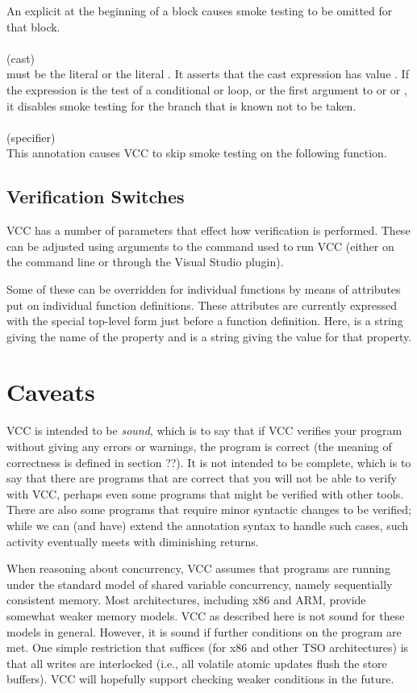 \documentclass[preprint,nocopyrightspace]{sigplanconf}
\begin{document}
{{{An explicit  at the beginning of a block causes
smoke testing to be omitted for that block. 
\\\\
 (cast)\\
 must be the literal \vcc{\true} or the
literal \vcc{\false}. It asserts that the cast expression has
value . If the expression is the test of a conditional or loop, or
the first argument to \vcc{||} or \vcc{&&} or , it disables
smoke testing for the branch that is known not to be taken.
\\\\
 (specifier)\\
This annotation causes VCC to skip smoke testing on the following function.

\subsection{Verification Switches}
VCC has a number of parameters that effect how verification is
performed. These can be adjusted using arguments to the command used
to run VCC (either on the command line or through the Visual Studio
plugin). 

Some of these can be overridden for individual functions by
means of attributes put on individual function definitions. These
attributes are currently expressed with the special top-level form 
 just before a function
definition. Here,  is a string giving the name
of the property and  is a string giving the value for
that property. 


\section{Caveats}
VCC is intended to be \emph{sound}, which is to say that if VCC
verifies your program without giving any errors or warnings, the
program is correct (the meaning of correctness is defined in section
??). It is not intended to be complete, which is to say that there are
programs that are correct that you will not be able to verify with
VCC, perhaps even some programs that might be verified with other
tools. There are also some programs that require minor syntactic
changes to be verified; while we can (and have) extend the annotation
syntax to handle such cases, such activity eventually meets with
diminishing returns.

When reasoning about concurrency, VCC assumes that programs are
running under the standard model of shared variable concurrency,
namely sequentially consistent memory. Most architectures, including
x86 and ARM, provide somewhat weaker memory models. VCC as described
here is not sound for these models in general. However, it is sound if
further conditions on the program are met. One simple restriction that
suffices (for x86 and other TSO architectures) is that all writes are
interlocked (i.e., all volatile atomic updates flush the store
buffers). VCC will hopefully support checking weaker conditions in the
future.

}}}
\end{document}

